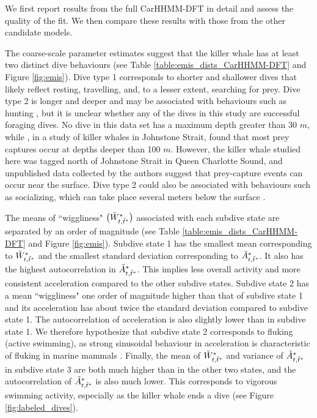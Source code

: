 We first report results from the full CarHHMM-DFT in detail and assess the quality of the fit. We then compare these results with those from the other candidate models.

The coarse-scale parameter estimates suggest that the killer whale has at least two distinct dive behaviours (see Table \ref{table:emis_dists_CarHHMM-DFT} and Figure \ref{fig:emis}). 
Dive type 1 corresponds to shorter and shallower dives that likely reflect resting, travelling, and, to a lesser extent, searching for prey.
Dive type 2 is longer and deeper and may be associated with behaviours such as hunting  \citep{Tennessen:2019b}, but it is unclear whether any of the dives in this study are successful foraging dives. No dive in this data set has a maximum depth greater than 30 $m$, while \citet{Wright:2017}, in a study of killer whales in Johnstone Strait, found that most prey captures occur at depths deeper than 100 $m$. However, the killer whale studied here was tagged north of Johnstone Strait in Queen Charlotte Sound, and unpublished data collected by the authors suggest that prey-capture events can occur near the surface.
Dive type 2 could also be associated with behaviours such as socializing, which can take place several meters below the surface \citep{Tennessen:2019b}.

The means of ``wiggliness" $\big(\tilde{W}^*_{t,\tilde t^*}\big)$ associated with each subdive state are separated by an order of magnitude (see Table \ref{table:emis_dists_CarHHMM-DFT} and Figure \ref{fig:emis}). 
Subdive state 1 has the smallest mean corresponding to $\tilde{W}^*_{t,\tilde t^*}$ and the smallest standard deviation corresponding to $\tilde{A}^*_{t,\tilde t^*}$. It also has the highest autocorrelation in $\tilde{A}^*_{t,\tilde t^*}$. This implies less overall activity and more consistent acceleration compared to the other subdive states. 
Subdive state 2 has a mean ``wiggliness" one order of magnitude higher than that of subdive state 1 and its acceleration has about twice the standard deviation compared to subdive state 1. The autocorrelation of acceleration is also slightly lower than in subdive state 1. We therefore hypothesize that subdive state 2 corresponds to fluking (active swimming), as strong sinusoidal behaviour in acceleration is characteristic of fluking in marine mammals \citep{Simon:2012}.
Finally, the mean of $\tilde{W}^*_{t,\tilde t^*}$ and variance of $\tilde{A}^*_{t,\tilde t^*}$ in subdive state 3 are both much higher than in the other two states, and the autocorrelation of $\tilde{A}^*_{t,\tilde t^*}$ is also much lower. This corresponds to vigorous swimming activity, especially as the killer whale ends a dive (see Figure \ref{fig:labeled_dives}). 

